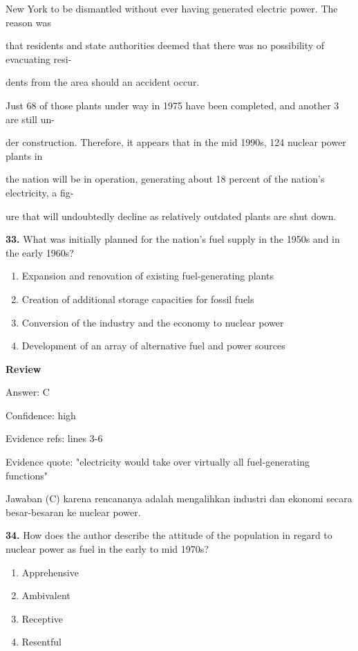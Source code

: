 \documentclass[12pt]{article}
\begin{document}
New York to be dismantled without ever having generated electric power. The reason was\par
that residents and state authorities deemed that there was no possibility of evacuating resi-\par
dents from the area should an accident occur.\par
Just 68 of those plants under way in 1975 have been completed, and another 3 are still un-\par
der construction. Therefore, it appears that in the mid 1990s, 124 nuclear power plants in\par
the nation will be in operation, generating about 18 percent of the nation's electricity, a fig-\par
ure that will undoubtedly decline as relatively outdated plants are shut down.\par
\endgroup
\medskip
\noindent\textbf{33.} What was initially planned for the nation's fuel supply in the 1950s and in the early 1960s?
\begin{enumerate}[label=(\Alph*),leftmargin=*,itemsep=0.2em]
\item Expansion and renovation of existing fuel-generating plants
\item Creation of additional storage capacities for fossil fuels
\item Conversion of the industry and the economy to nuclear power
\item Development of an array of alternative fuel and power sources
\end{enumerate}
\par
\begingroup
\setlength{\parskip}{0pt}
\setlength{\parindent}{0pt}
\textbf{Review}\par
Answer: C\par
Confidence: high\par
Evidence refs: lines 3-6\par
Evidence quote: "electricity would take over virtually all fuel-generating functions"\par
Jawaban (C) karena rencananya adalah mengalihkan industri dan ekonomi secara besar-besaran ke nuclear power.\par
\endgroup
\par
\vspace{0.25\baselineskip}
\noindent\textbf{34.} How does the author describe the attitude of the population in regard to nuclear power as fuel in the early to mid 1970s?
\begin{enumerate}[label=(\Alph*),leftmargin=*,itemsep=0.2em]
\item Apprehensive
\item Ambivalent
\item Receptive
\item Resentful
\end{enumerate}
\end{document}
